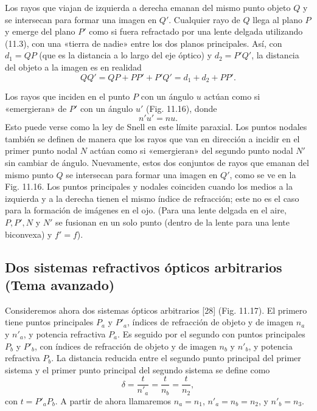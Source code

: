 \documentclass[12pt]{book}
\begin{document}
Los rayos que viajan de izquierda a derecha emanan del mismo punto objeto $Q$ y se intersecan para formar una imagen en $Q'$. Cualquier rayo de $Q$ llega al plano $P$ y emerge del plano $P'$ como si fuera refractado por una lente delgada utilizando (11.3), con una «tierra de nadie» entre los dos planos principales. Así, con $d_1 = QP$ (que es la distancia a lo largo del eje óptico) y $d_2 = P'Q'$, la distancia del objeto a la imagen es en realidad
\begin{equation}
\label{eq:11.26}
QQ' = QP + PP' + P'Q' = d_1 + d_2 + PP'.
\end{equation}

Los rayos que inciden en el punto $P$ con un ángulo $u$ actúan como si «emergieran» de $P'$ con un ángulo $u'$ (Fig. 11.16), donde
\begin{equation}
\label{eq:11.27}
n'u' = nu.
\end{equation}
Esto puede verse como la ley de Snell en este límite paraxial. Los puntos nodales también se definen de manera que los rayos que van en dirección a incidir en el primer punto nodal $N$ actúan como si «emergieran» del segundo punto nodal $N'$ sin cambiar de ángulo. Nuevamente, estos dos conjuntos de rayos que emanan del mismo punto $Q$ se intersecan para formar una imagen en $Q'$, como se ve en la Fig. 11.16. Los puntos principales y nodales coinciden cuando los medios a la izquierda y a la derecha tienen el mismo índice de refracción; este no es el caso para la formación de imágenes en el ojo. (Para una lente delgada en el aire, $P, P', N$ y $N'$ se fusionan en un solo punto (dentro de la lente para una lente biconvexa) y $f' = f$).

\subsection{Dos sistemas refractivos ópticos arbitrarios (Tema avanzado)}

Consideremos ahora dos sistemas ópticos arbitrarios [28] (Fig. 11.17). El primero tiene puntos principales $P_a$ y $P'_a$, índices de refracción de objeto y de imagen $n_a$ y $n'_a$, y potencia refractiva $P_a$. Es seguido por el segundo con puntos principales $P_b$ y $P'_b$, con índices de refracción de objeto y de imagen $n_b$ y $n'_b$, y potencia refractiva $P_b$. La distancia reducida entre el segundo punto principal del primer sistema y el primer punto principal del segundo sistema se define como
\begin{equation}
\label{eq:11.28}
\delta = \frac{t}{n'_a} = \frac{t}{n_b} = \frac{t}{n_2},
\end{equation}
con $t = P'_a P_b$. A partir de ahora llamaremos $n_a = n_1$, $n'_a = n_b = n_2$, y $n'_b = n_3$.
\end{document}
